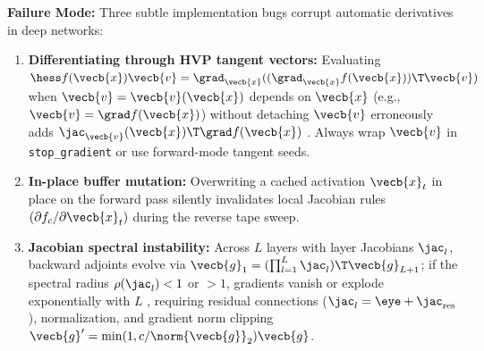 \documentclass[../../../../master.tex]{subfiles}
\begin{document}
\begin{pitfall}
\textbf{Failure Mode:} Three subtle implementation bugs corrupt automatic derivatives in deep networks:
\begin{enumerate}[leftmargin=1.5em]
  \item \textbf{Differentiating through HVP tangent vectors:} Evaluating $\hess f(\vecb{x})\vecb{v} = \grad_{\vecb{x}}((\grad_{\vecb{x}} f(\vecb{x}))\T \vecb{v})$ when $\vecb{v} = \vecb{v}(\vecb{x})$ depends on $\vecb{x}$ (e.g., $\vecb{v} = \grad f(\vecb{x})$) without detaching $\vecb{v}$ erroneously adds $\jac_{\vecb{v}}(\vecb{x})\T \grad f(\vecb{x})$ . Always wrap $\vecb{v}$ in \texttt{stop\_gradient} or use forward-mode tangent seeds.
  \item \textbf{In-place buffer mutation:} Overwriting a cached activation $\vecb{x}_t$ in place on the forward pass silently invalidates local Jacobian rules $(\partial f_c/\partial \vecb{x}_t)$ during the reverse tape sweep.
  \item \textbf{Jacobian spectral instability:} Across $L$ layers with layer Jacobians $\jac_l$, backward adjoints evolve via $\vecb{g}_1 = (\prod_{l=1}^L \jac_l)\T \vecb{g}_{L+1}$; if the spectral radius $\rho(\jac_l) < 1$ or $> 1$, gradients vanish or explode exponentially with $L$ , requiring residual connections ($\jac_l = \eye + \jac_{\text{res}}$), normalization, and gradient norm clipping $\vecb{g}' = \min(1, c/\norm{\vecb{g}}_2)\vecb{g}$.
\end{enumerate}
\end{pitfall}
\end{document}
